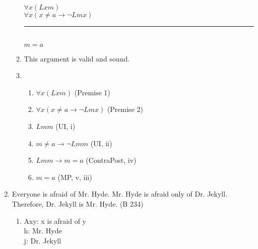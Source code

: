 \documentclass{article}
\begin{document}
\begin{enumerate}
\begin{enumerate}
                        $\forall x(Lxm)$\\
                        $\forall x(x \neq a \to \neg Lmx)$\\
                        \rule{15em}{.5pt}\\
                        $m=a$
                  \item This argument is valid and sound.
                        \setcounter{enumii}{3}
                  \item \begin{enumerate}
                              \item $\forall x(Lxm)$ (Premise 1)
                              \item $\forall x(x \neq a \to \neg Lmx)$ (Premise 2)
                              \item $Lmm$ (UI, i)
                              \item $m \neq a \to \neg Lmm$ (UI, ii)
                              \item $Lmm \to m = a$ (ContraPost, iv)
                              \item $m = a$ (MP, v, iii)
                        \end{enumerate}
            \end{enumerate}
      \item Everyone is afraid of Mr. Hyde. Mr. Hyde is afraid only of Dr. Jekyll. Therefore, Dr. Jekyll is Mr. Hyde. (B 234)
            \begin{enumerate}
                  \item Axy: x is afraid of y\\
                        h: Mr. Hyde\\
                        j: Dr. Jekyll\\


\end{enumerate}
\end{enumerate}
\end{document}
